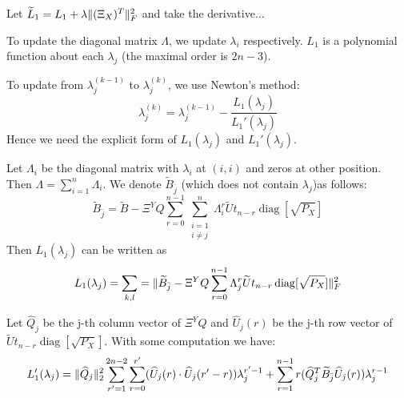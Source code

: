 \documentclass{article}
\DeclarePairedDelimiter\norm{\lVert}{\rVert}
\DeclareMathOperator\diag{diag}
\begin{document}
Let $\widetilde{L}_1 = L_1 + \lambda \norm{(\Xi_X)^T}_F^2$ and take the derivative...

To update the diagonal matrix $\Lambda $, we update $\lambda_i$ respectively. $L_1$ is a polynomial function about each $\lambda_j$ (the maximal order is $2n-3$).

To update from $\lambda_j^{(k-1)}$ to $\lambda_j^{(k)}$, we use Newton's method:
$$
\lambda_j^{(k)} = \lambda_j^{(k-1)} - \frac{L_1(\lambda_j)}{L_1'(\lambda_j)}
$$
Hence we need the explicit form of $L_1(\lambda_j)$ and $L_1'(\lambda_j)$.

Let $\Lambda_i$ be the diagonal matrix with $\lambda_i$ at $(i, i)$ and zeros at other position. Then
$\Lambda = \sum_{i=1}^n \Lambda_i$. We denote $\widetilde{B}_{\bar{j}}$ (which does not contain $\lambda_j$)as follows:
$$
 \widetilde{B}_{\bar{j}} = \widetilde{B} - \Xi^Y Q \sum_{r=0}^{n-1} \sum_{\substack{i = 1 \\ i \neq j} }^n \Lambda_i^r \widetilde{U} t_{n-r} \diag [\sqrt{P_X}]
$$
Then $L_1(\lambda_j)$ can be written as
$$
L_1(\lambda_j) = \sum_{k, l} = \norm{\widetilde{B}_{\bar{j}} - \Xi^YQ\sum_{r=0}^{n-1} \Lambda_j^r \widetilde{U} t_{n-r} \diag [\sqrt{P_X}] }_F^2
$$

Let $\widehat{Q}_j$ be the j-th column vector of $\Xi^Y Q$ and $\widehat{U}_j(r)$ be the j-th row vector of $\widetilde{U} t_{n-r} \diag [\sqrt{P_X}]$. 
With some computation we have:
$$
L_1'(\lambda_j) = \norm{\widehat{Q}_j}_2^2 \sum_{r'=1}^{2n-2} \sum_{r= 0 }^{r'}  (\widehat{U}_j(r) \cdot \widehat{U}_j(r'-r))
\lambda_j^{r'-1} + \sum_{r = 1}^{n-1} r(\widehat{Q}_j^T \widetilde{B}_{\bar{j}} \widehat{U}_j(r)) \lambda_j^{r-1}
$$
\end{document}

